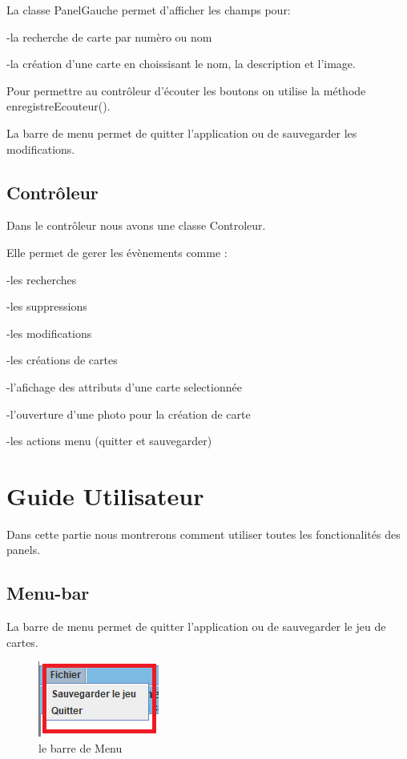 \documentclass{article}
\begin{document}
La classe PanelGauche permet d'afficher les champs pour:

-la recherche de carte par numèro ou nom 

-la création d'une carte en choissisant le nom, la description et l'image.

Pour permettre au contrôleur d'écouter les boutons on utilise la méthode enregistreEcouteur().

La barre de menu permet de quitter l'application ou de sauvegarder les modifications.

\subsection{Contrôleur}
Dans le contrôleur nous avons une classe Controleur.

Elle permet de gerer les évènements comme :

	   -les recherches
	   
	   -les suppressions
	   
	   -les modifications
	   
	   -les créations de cartes
	   
	   -l'afichage des attributs d'une carte selectionnée
	   
	   -l'ouverture d'une photo pour la création de carte
	   
	   -les actions menu (quitter et sauvegarder)


\section{Guide Utilisateur}
Dans cette partie nous montrerons comment utiliser toutes les fonctionalités des panels.

\subsection{Menu-bar}

La barre de menu permet de quitter l'application ou de sauvegarder le jeu de cartes.

\begin{figure}[!h]
\centering
\includegraphics[scale=1]{bar_menu.png}
\caption{le barre de Menu}
\label{fig:bar_menu}
\end{figure}
\end{document}

